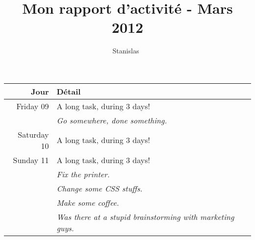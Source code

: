 \documentclass{mybusinessrac}
\begin{document}
\title{Mon rapport d'activité - Mars 2012}
\author{Stanislas~}


\maketitle
\makerefs

\begin{tabular}{ r p{14cm} }
\textbf{Jour}              & \textbf{Détail} \\
\hline\noalign{\smallskip}
 Friday 09  & A long task, during 3 days!\\
   & \emph{Go somewhere, done something.}\\
 Saturday 10  & A long task, during 3 days!\\
 Sunday 11  & A long task, during 3 days!\\
   & \emph{Fix the printer.}\\
   & \emph{Change some CSS stuffs.}\\
   & \emph{Make some coffee.}\\
   & \emph{Was there at a stupid brainstorming with marketing guys.}\\
\end{tabular}
\end{document}
